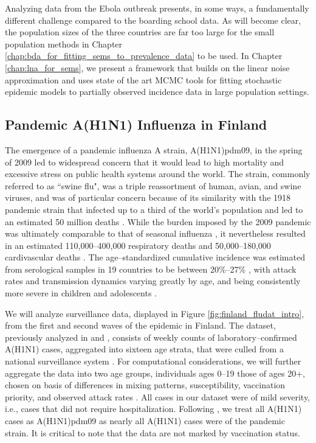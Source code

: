Analyzing data from the Ebola outbreak presents, in some ways, a fundamentally different challenge compared to the boarding school data. As will become clear, the population sizes of the three countries are far too large for the small population methods in Chapter \ref{chap:bda_for_fitting_sems_to_prevalence_data} to be used. In Chapter \ref{chap:lna_for_sems}, we present a framework that builds on the linear noise approximation and uses state of the art MCMC tools for fitting stochastic epidemic models to partially observed incidence data in large population settings. 

\subsection{Pandemic A(H1N1) Influenza in Finland}
\label{subsec:flu_description}

The emergence of a pandemic influenza A strain, A(H1N1)pdm09, in the spring of 2009 led to widespread concern that it would lead to high mortality and excessive stress on public health systems around the world. The strain, commonly referred to as ``swine flu", was a triple reassortment of human, avian, and swine viruses, and was of particular concern because of its similarity with the 1918 pandemic strain that infected up to a third of the world's population and led to an estimated 50 million deaths \cite{cdc1918pandemic}. While the burden imposed by the 2009 pandemic was ultimately comparable to that of seasonal influenza \cite{iuliano2018estimates}, it nevertheless resulted in an estimated 110,000--400,000 respiratory deaths and 50,000--180,000 cardivascular deaths \cite{dawood2012estimated}. The age--standardized cumulative incidence was estimated from serological samples in 19 countries to be between 20\%--27\% \cite{van2013estimating}, with attack rates and transmission dynamics varying greatly by age, and being consistently more severe in children and adolescents \cite{opatowski2011transmission,steens2011age,van2013estimating,yang2015inference}. 

We will analyze surveillance data, displayed in Figure \ref{fig:finland_fludat_intro}, from the first and second waves of the epidemic in Finland. The dataset, previously analyzed in \cite{shubin2016revealing} and \cite{shubin2014estimating}, consists of weekly counts of laboratory--confirmed A(H1N1) cases, aggregated into sixteen age strata, that were culled from a national surveillance system \cite{lyytikainen2011surveillance}. For computational considerations, we will further aggregate the data into two age groups, individuals ages 0--19 those of ages 20+, chosen on basis of differences in mixing patterns, susceptibility, vaccination priority, and observed attack rates \cite{kelly2011age,opatowski2011transmission,steens2011age}. All cases in our dataset were of mild severity, i.e., cases that did not require hospitalization. Following \cite{shubin2016revealing,shubin2014estimating}, we treat all A(H1N1) cases as A(H1N1)pdm09 as nearly all A(H1N1) cases were of the pandemic strain. It is critical to note that the data are not marked by vaccination status.

